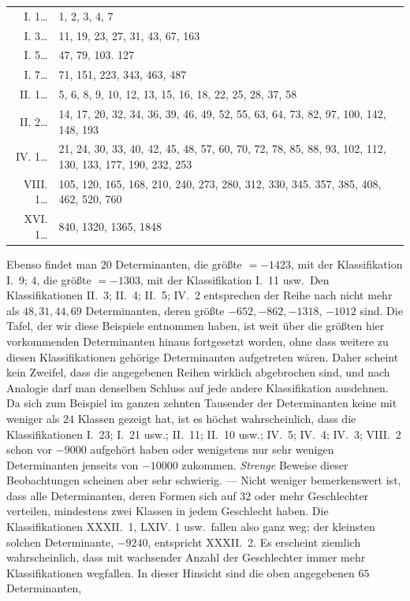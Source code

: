 \begin{center}\begin{tabularx}{\textwidth}{@{}r@{\quad}X@{}}
I. 1\;\ldots & 1, 2, 3, 4, 7\\[2pt]
I. 3\;\ldots & 11, 19, 23, 27, 31, 43, 67, 163\\[2pt]
I. 5\;\ldots & 47, 79, 103. 127\\[2pt]
I. 7\;\ldots & 71, 151, 223, 343, 463, 487\\[2pt]
II. 1\;\ldots & 5, 6, 8, 9, 10, 12, 13, 15, 16, 18, 22, 25, 28, 37, 58\\[2pt]
II. 2\;\ldots & 14, 17, 20, 32, 34, 36, 39, 46, 49, 52, 55, 63, 64, 73, 82, 97, 100, 142, 148, 193\\[2pt]
IV. 1\;\ldots & 21, 24, 30, 33, 40, 42, 45, 48, 57, 60, 70, 72, 78, 85, 88, 93, 102, 112, 130, 133, 177, 190, 232, 253\\[2pt]
VIII. 1\;\ldots & 105, 120, 165, 168, 210, 240, 273, 280, 312, 330, 345. 357, 385, 408, 462, 520, 760\\[2pt]
XVI. 1\;\ldots & 840, 1320, 1365, 1848\\[2pt]
\end{tabularx}\end{center}
Ebenso findet man \(20\) Determinanten, die größte \(=-1423\), mit der Klassifikation I.~9; \(4\), die größte \(=-1303\), mit der Klassifikation I.~11 usw.\ Den Klassifikationen II.~3; II.~4; II.~5; IV.~2 entsprechen der Reihe nach nicht mehr als \(48,31,44,69\) Determinanten, deren größte \(-652,-862,-1318\), \(-1012\) sind. Die Tafel, der wir diese Beispiele entnommen haben, ist weit über die größten hier vorkommenden Determinanten hinaus fortgesetzt worden, ohne dass weitere zu diesen Klassifikationen gehörige Determinanten aufgetreten wären. Daher scheint kein Zweifel, dass die angegebenen Reihen wirklich abgebrochen sind, und nach Analogie darf man denselben Schluss auf jede andere Klassifikation ausdehnen. Da sich zum Beispiel im ganzen zehnten Tausender der Determinanten keine mit weniger als \(24\) Klassen gezeigt hat, ist es höchst wahrscheinlich, dass die Klassifikationen I.~23; I.~21 usw.; II.~11; II.~10 usw.; IV.~5; IV.~4; IV.~3; VIII.~2 schon vor \(-9000\) aufgehört haben oder wenigstens nur sehr wenigen Determinanten jenseits von \(-10000\) zukommen. \textit{Strenge} Beweise dieser Beobachtungen scheinen aber sehr schwierig. — Nicht weniger bemerkenswert ist, dass alle Determinanten, deren Formen sich auf \(32\) oder mehr Geschlechter verteilen, mindestens zwei Klassen in jedem Geschlecht haben. Die Klassifikationen XXXII.~1, LXIV. 1 usw.\ fallen also ganz weg; der kleinsten solchen Determinante, \(-9240\), entspricht XXXII.~2. Es erscheint ziemlich wahrscheinlich, dass mit wachsender Anzahl der Geschlechter immer mehr Klassifikationen wegfallen. In dieser Hinsicht sind die oben angegebenen \(65\) Determinanten,
